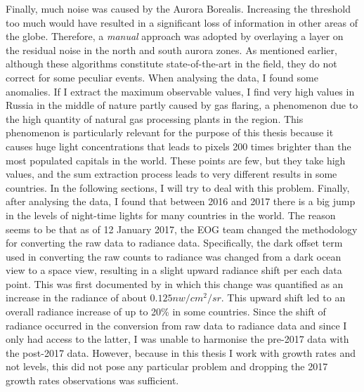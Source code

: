 Finally, much noise was caused by the Aurora Borealis. Increasing the threshold too much would have resulted in a significant loss of information in other areas of the globe. Therefore, a \textit{manual} approach was adopted by overlaying a layer on the residual noise in the north and south aurora zones.
As mentioned earlier, although these algorithms \citep{elvidge2021annual} constitute state-of-the-art in the field, they do not correct for some peculiar events. When analysing the data, I found some anomalies. If I extract the maximum observable values, I find very high values in Russia in the middle of nature partly caused by gas flaring, a phenomenon due to the high quantity of natural gas processing plants in the region.
This phenomenon is particularly relevant for the purpose of this thesis because it causes huge light concentrations that leads to pixels 200 times brighter than the most populated capitals in the world. 
These points are few, but they take high values, and the sum extraction process leads to very different results in some countries. In the following sections, I will try to deal with this problem.
Finally, after analysing the data, I found that between 2016 and 2017 there is a big jump in the levels of night-time lights for many countries in the world. The reason seems to be that as of 12 January 2017, the EOG team changed the methodology for converting the raw data to radiance data.
Specifically, the dark offset term used in converting the raw counts to radiance was changed from a dark ocean view to a space view, resulting in a slight upward radiance shift per each data point. This was first documented by \citet{elvidge2020indicators} in which this change was quantified as an increase in the radiance of about $0.125nw/cm^2/sr$. This upward shift led to an overall radiance increase of up to 20\% in some countries.
Since the shift of radiance occurred in the conversion from raw data to radiance data and since I only had access to the latter, I was unable to harmonise the pre-2017 data with the post-2017 data. However, because in this thesis I work with growth rates and not levels, this did not pose any particular problem and dropping the 2017 growth rates observations was sufficient. 

